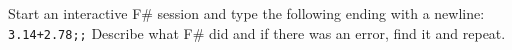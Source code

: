 \label{ex:interactiveSession}
Start an interactive F\# session and type the following ending with a newline: \lstinline{3.14+2.78;;} Describe what F\# did and if there was an error, find it and repeat.
